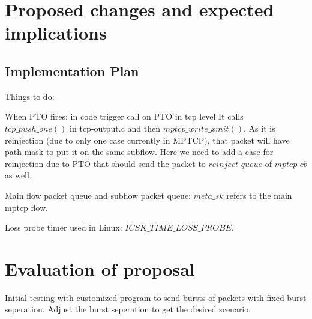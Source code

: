 \documentclass[12pt,draftcls,onecolumn]{IEEEtran}
\begin{document}
\section{Proposed changes and expected implications}


\subsection{Implementation Plan}

Things to do:



When PTO fires: in code trigger call on PTO in tcp level
It calls ${tcp\_push\_one()}$ in tcp-output.c and then ${mptcp\_write\_xmit()}$.
As it is reinjection (due to only one case currently in MPTCP), that packet will have path mask
to put it on the same subflow. Here we need to add a case for reinjection due to PTO that should
send the packet to $reinject\_queue$ of ${mptcp\_cb}$ as well.


Main flow packet queue and subflow packet queue: ${meta\_sk}$ refers to the
main mptcp flow.

Loss probe timer used in Linux: ${ICSK\_TIME\_LOSS\_PROBE}$.

\section{Evaluation of proposal}

Initial testing with customized program to send bursts of packets with fixed burst seperation. Adjust the burst seperation to get the desired scenario.







\end{document}

